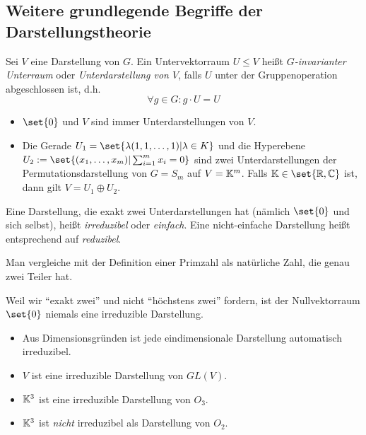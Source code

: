 \subsection{Weitere grundlegende Begriffe der Darstellungstheorie}
\begin{definition}[Unterdarstellungen]
Sei $V$ eine Darstellung von $G$. Ein Untervektorraum $U\leq V$ heißt \emph{$G$-invarianter Unterraum} oder \emph{Unterdarstellung von $V$}, falls $U$ unter der Gruppenoperation abgeschlossen ist, d.h.
\[\forall g\in G: g\cdot U = U\]
\end{definition}

\begin{example}
\begin{itemize}
\item $\set{0}$ und $V$ sind immer Unterdarstellungen von $V$.
\item Die Gerade $U_1=\set{\lambda(1,1,\ldots,1) | \lambda\in K}$ und die Hyperebene $U_2 := \set{(x_1,\ldots,x_m) | \sum_{i=1}^m x_i = 0}$ sind zwei Unterdarstellungen der Permutationsdarstellung von $G=S_m$ auf $V=\mathbb{K}^m$. Falls $\IK\in\set{\IR,\IC}$ ist, dann gilt $V=U_1\oplus U_2$.
\end{itemize}
\end{example}

\begin{definition}
Eine Darstellung, die exakt zwei Unterdarstellungen hat (nämlich $\set{0}$ und sich selbst), heißt \emph{irreduzibel} oder \emph{einfach}. Eine nicht-einfache Darstellung heißt entsprechend auf \emph{reduzibel}.
\end{definition}

\begin{remark}
Man vergleiche mit der Definition einer Primzahl als natürliche Zahl, die genau zwei Teiler hat.
\end{remark}

\begin{remark}
Weil wir \enquote{exakt zwei} und nicht \enquote{höchstens zwei} fordern, ist der Nullvektorraum $\set{0}$ niemals eine irreduzible Darstellung.
\end{remark}

\begin{example}
\begin{itemize}
\item Aus Dimensionsgründen ist jede eindimensionale Darstellung automatisch irreduzibel.
\item $V$ ist eine irreduzible Darstellung von $GL(V)$.
\item $\mathbb{K}^3$ ist eine irreduzible Darstellung von $O_3$.
\item $\mathbb{K}^3$ ist \emph{nicht} irreduzibel als Darstellung von $O_2$.
\end{itemize}
\end{example}

